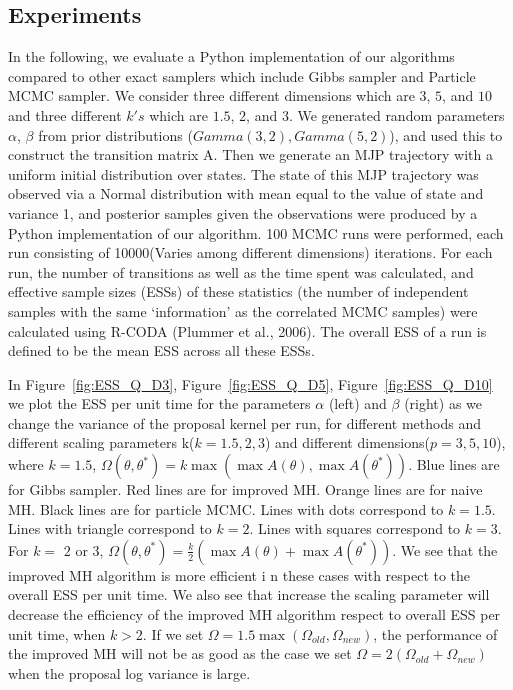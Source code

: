 \subsection{Experiments}

In the following, we evaluate a Python implementation of our algorithms compared to other exact samplers which include Gibbs sampler and Particle MCMC sampler. We consider three different dimensions which are $3$, $5$, and $10$ and three different $k's$ which are $1.5$, $2$, and $3$. We generated random parameters $\alpha$, $\beta$ from prior distributions ($Gamma(3,2), Gamma(5, 2)$), and used this to construct the transition matrix A. Then we generate an MJP trajectory with a uniform initial distribution over states. The state of this MJP trajectory was observed via a Normal distribution with mean equal to the value of state and variance 1, and posterior samples given the observations were produced by a Python implementation of our algorithm. 100 MCMC runs were performed, each run consisting of 10000(Varies among different dimensions) iterations. For each run, the number of transitions as well as the time spent was calculated, and effective sample sizes (ESSs) of these statistics (the number of independent samples with the same `information' as the correlated MCMC samples) were calculated using R-CODA (Plummer et al., 2006). The overall ESS of a run is defined to be the mean ESS across all these ESSs.

  In Figure~\ref{fig:ESS_Q_D3}, Figure~\ref{fig:ESS_Q_D5}, Figure~\ref{fig:ESS_Q_D10} we plot the ESS per unit time for the parameters $\alpha$ (left) and $\beta$ (right) as we change the variance of the
  proposal kernel per run, for different methods and different scaling parameters k($k = 1.5, 2, 3$) and different dimensions($p = 3, 5, 10$), where   $k = 1.5$,  $\Omega(\theta, \theta^*) = k \max(\max A(\theta), \max A(\theta^*))$. Blue lines are for Gibbs sampler. Red lines are for improved MH. Orange lines are for naive MH. Black lines are for particle MCMC. Lines with dots correspond to $k = 1.5$. Lines with triangle correspond to $k = 2$. Lines with squares correspond to $k = 3$. For $k=$ $2$ or $3$, $\Omega(\theta, \theta^*) = \frac{k}{2} (\max A(\theta) + \max A(\theta^*))$. We see that the improved MH algorithm is more efficient i	n these cases with respect to the overall ESS per unit time. We also see that increase the scaling parameter will decrease the efficiency of the improved MH algorithm respect to overall ESS per unit time, when $k > 2$. If we set $\Omega = 1.5 \max(\Omega_{old}, \Omega_{new})$, the performance of the improved MH will not be as good as the case we set $\Omega = 2(\Omega_{old} + \Omega_{new})$ when the proposal log variance is large.\\


